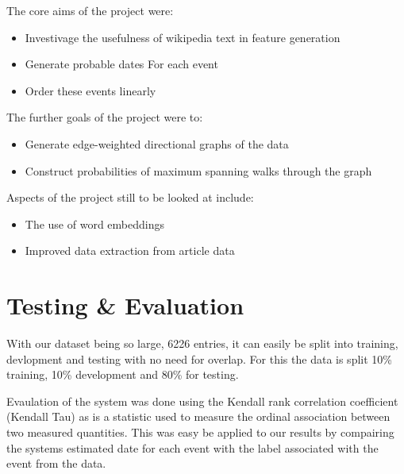 \documentclass[12pt]{report}
\begin{document}
        \noindent The core aims of the project were: 
            \begin{itemize}
            \item Investivage the usefulness of wikipedia text in feature generation
            \item Generate probable dates For each event
            \item Order these events linearly
            \end{itemize}

        \noindent The further goals of the project were to:
        \begin{itemize}
          \item Generate edge-weighted directional graphs of the data
          \item Construct probabilities of maximum spanning walks through the graph
        \end{itemize}

        \noindent Aspects of the project still to be looked at include:
        \begin{itemize}
          \item The use of word embeddings
          \item Improved data extraction from article data
        \end{itemize}

        \section{Testing \& Evaluation}
        With our dataset being so large, 6226 entries, it can
        easily be split into training, devlopment and testing with no
        need for overlap. For this the data is split 10\% training,
        10\% development and 80\% for testing.


        Evaulation of the system was done using the Kendall rank correlation coefficient (Kendall Tau)
        as  is a statistic used to measure the ordinal association between two
        measured quantities. This was easy be applied to our results
        by compairing the systems estimated date for each event
        with the label associated with the event from the data.

        
\end{document}
